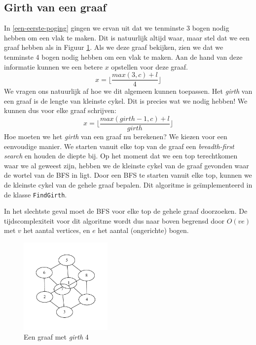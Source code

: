 \documentclass{article}
\begin{document}
\subsection{Girth van een graaf}
\label{girth-bounding}
In \ref{een-eerste-poging} gingen we ervan uit dat we tenminste 3 bogen nodig
hebben om een vlak te maken. Dit is natuurlijk altijd waar, maar stel dat we
een graaf hebben als in Figuur \ref{fig:cube}. Als we deze graaf bekijken, zien
we dat we tenminste 4 bogen nodig hebben om een vlak te maken. Aan de hand van
deze informatie kunnen we een betere $x$ opstellen voor deze graaf.
\begin{equation*}
x = \lfloor\frac{max(3, c) + l}{4}\rfloor
\end{equation*}
We vragen ons natuurlijk af hoe we dit algemeen kunnen toepassen. Het
\emph{girth} van een graaf is de lengte van kleinste cykel. Dit is precies wat
we nodig hebben! We kunnen dus voor elke graaf schrijven:
\begin{equation*}
x = \lfloor\frac{max(girth - 1, c) + l}{girth}\rfloor
\end{equation*}
Hoe moeten we het \emph{girth} van een graaf nu berekenen? We kiezen voor een
eenvoudige manier. We starten vanuit elke top van de graaf een
\emph{breadth-first search} en houden de diepte bij. Op het moment dat we een
top terechtkomen waar we al geweest zijn, hebben we de kleinste cykel van de
graaf gevonden waar de wortel van de BFS in ligt. Door een BFS te starten vanuit
elke top, kunnen we de kleinste cykel van de gehele graaf bepalen.  Dit
algoritme is ge\"implementeerd in de klasse \verb#FindGirth#.
\newline

In het slechtste geval moet de BFS voor elke top de gehele graaf doorzoeken. De
tijdscomplexiteit voor dit algoritme wordt dus naar boven begrensd door $O(ve)$
met $v$ het aantal vertices, en $e$ het aantal (ongerichte) bogen.

\begin{figure}
\begin{center}
\includegraphics[width=0.4\textwidth]{images/cube.pdf}
\caption{Een graaf met \emph{girth} 4}
\label{fig:cube}
\end{center}
\end{figure}
\end{document}
